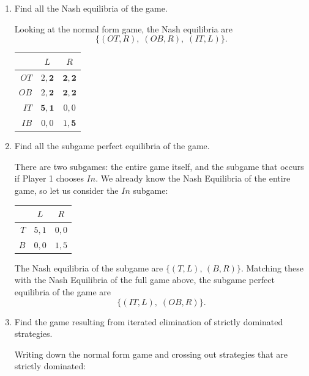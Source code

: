 \documentclass[11pt,english]{article}
\begin{document}
\begin{enumerate}
\begin{solution}
\begin{center}
\begin{tabular}{r|cc}
\toprule
        & $L$     & $R$     \\
\midrule
$OT$    & $(2,2)$ & $(2,2)$ \\
$OB$    & $(2,2)$ & $(2,2)$ \\
$IT$    & $(5,1)$ & $(0,0)$ \\
$IB$    & $(0,0)$ & $(1,5)$ \\
\bottomrule
\end{tabular}
\end{center}
\end{solution}
  \item[(3)] Find all the Nash equilibria of the game.
\begin{solution}
Looking at the normal form game, the Nash equilibria are
\[
    \boxed{\{(OT, R),\; (OB, R),\; (IT, L)\}.}
\]
 
\begin{center}
\begin{tabular}{r|cc}
\toprule
        & $L$     & $R$     \\
\midrule
$OT$    & $2,\mathbf{2}$   & $\mathbf{2,2}$   \\
$OB$    & $2,\mathbf{2}$   & $\mathbf{2,2}$   \\
$IT$    & $\mathbf{5,1}$   & $0,0$   \\
$IB$    & $0,0$   & $1,\mathbf{5}$   \\
\bottomrule
\end{tabular}
\end{center}
\end{solution}
  \item[(4)] Find all the subgame perfect equilibria of the game.
\begin{solution}
There are two subgames: the entire game itself, and the subgame that occurs if
Player 1 chooses $In$. We already know the Nash Equilibria of the entire game,
so let us consider the $In$ subgame:
 
\begin{center}
\begin{tabular}{r|cc}
\toprule
  & $L$   & $R$   \\
\midrule
$T$ & $5,1$ & $0,0$ \\
$B$ & $0,0$ & $1,5$ \\
\bottomrule
\end{tabular}
\end{center}
 
The Nash equilibria of the subgame are $\{(T,L),\, (B,R)\}$. Matching these
with the Nash Equilibria of the full game above, the subgame perfect equilibria
of the game are
\[
    \boxed{\{(IT, L),\; (OB, R)\}.}
\]
\end{solution}
  \item[(5)] Find the game resulting from iterated elimination of strictly
    dominated strategies.
\begin{solution}
Writing down the normal form game and crossing out strategies that are strictly
dominated:
 

\end{solution}
\end{enumerate}
\end{document}

